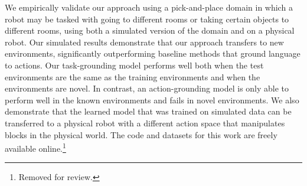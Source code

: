 \documentclass[conference]{IEEEtran}
\begin{document}

We empirically validate our approach using a
pick-and-place domain in which a robot may be tasked with going to
different rooms or taking certain objects to different rooms, using both a simulated version of the domain and
on a physical robot.  Our simulated results
demonstrate that our approach transfers to new environments,
significantly outperforming baseline methods that ground language to
actions.  
Our task-grounding
model performs well both when the test environments are the same as
the training environments and when the environments are novel. In
contrast, an action-grounding model is only able to perform well in
the known environments and fails in novel environments.  We also
demonstrate that the learned model that was trained on simulated
data can be transferred to a physical robot with a different action
space that manipulates blocks in the physical world. The code and
datasets for 
this work are freely available online.\footnote{%
Removed for review.}


\end{document}
